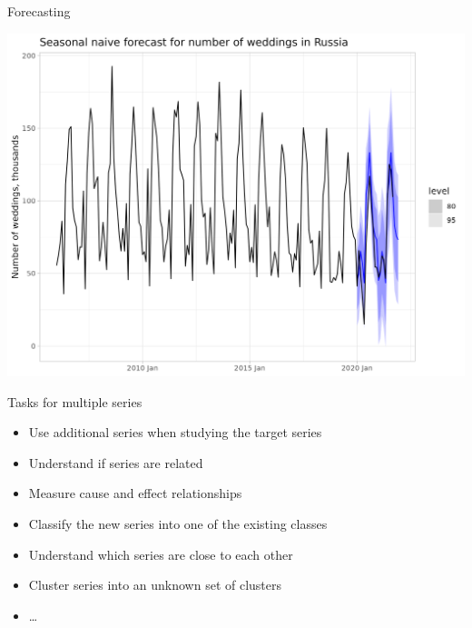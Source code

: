 \begin{frame}{Forecasting}
	
	\includegraphics[width=\textwidth]{pictures/om_ts_01-017.png}
	
\end{frame}


\begin{frame}{Tasks for multiple series}
	
	\begin{itemize}[<+->]
		\item Use additional series when studying the target series
		\item Understand if series are related
		\item Measure cause and effect relationships
		\item Classify the new series into one of the existing classes
		\item Understand which series are close to each other
		\item Cluster series into an unknown set of clusters
		\item \ldots
	\end{itemize}
	
\end{frame}

